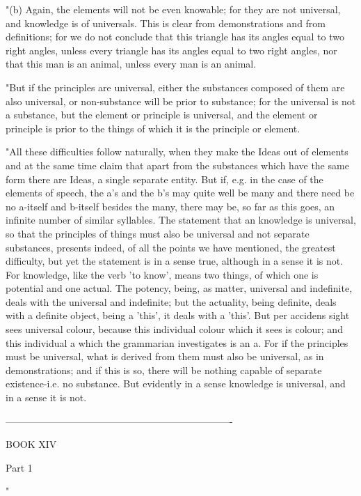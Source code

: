 "(b) Again, the elements will not be even knowable; for they are not
universal, and knowledge is of universals. This is clear from demonstrations
and from definitions; for we do not conclude that this triangle has
its angles equal to two right angles, unless every triangle has its
angles equal to two right angles, nor that this man is an animal,
unless every man is an animal. 

"But if the principles are universal, either the substances composed
of them are also universal, or non-substance will be prior to substance;
for the universal is not a substance, but the element or principle
is universal, and the element or principle is prior to the things
of which it is the principle or element. 

"All these difficulties follow naturally, when they make the Ideas
out of elements and at the same time claim that apart from the substances
which have the same form there are Ideas, a single separate entity.
But if, e.g. in the case of the elements of speech, the a's and the
b's may quite well be many and there need be no a-itself and b-itself
besides the many, there may be, so far as this goes, an infinite number
of similar syllables. The statement that an knowledge is universal,
so that the principles of things must also be universal and not separate
substances, presents indeed, of all the points we have mentioned,
the greatest difficulty, but yet the statement is in a sense true,
although in a sense it is not. For knowledge, like the verb 'to know',
means two things, of which one is potential and one actual. The potency,
being, as matter, universal and indefinite, deals with the universal
and indefinite; but the actuality, being definite, deals with a definite
object, being a 'this', it deals with a 'this'. But per accidens sight
sees universal colour, because this individual colour which it sees
is colour; and this individual a which the grammarian investigates
is an a. For if the principles must be universal, what is derived
from them must also be universal, as in demonstrations; and if this
is so, there will be nothing capable of separate existence-i.e. no
substance. But evidently in a sense knowledge is universal, and in
a sense it is not. 

----------------------------------------------------------------------

BOOK XIV

Part 1 

"


